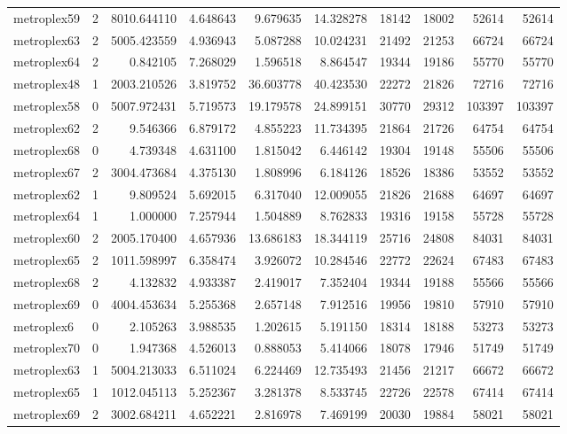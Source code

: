 \begin{longtable}{|l|r|r|r|r|r|r|r|r|r|}
metroplex59 & 2 & 8010.644110 & 4.648643 & 9.679635 & 14.328278 & 18142 & 18002 & 52614 & 52614 \\
metroplex63 & 2 & 5005.423559 & 4.936943 & 5.087288 & 10.024231 & 21492 & 21253 & 66724 & 66724 \\
metroplex64 & 2 & 0.842105 & 7.268029 & 1.596518 & 8.864547 & 19344 & 19186 & 55770 & 55770 \\
metroplex48 & 1 & 2003.210526 & 3.819752 & 36.603778 & 40.423530 & 22272 & 21826 & 72716 & 72716 \\
metroplex58 & 0 & 5007.972431 & 5.719573 & 19.179578 & 24.899151 & 30770 & 29312 & 103397 & 103397 \\
metroplex62 & 2 & 9.546366 & 6.879172 & 4.855223 & 11.734395 & 21864 & 21726 & 64754 & 64754 \\
metroplex68 & 0 & 4.739348 & 4.631100 & 1.815042 & 6.446142 & 19304 & 19148 & 55506 & 55506 \\
metroplex67 & 2 & 3004.473684 & 4.375130 & 1.808996 & 6.184126 & 18526 & 18386 & 53552 & 53552 \\
metroplex62 & 1 & 9.809524 & 5.692015 & 6.317040 & 12.009055 & 21826 & 21688 & 64697 & 64697 \\
metroplex64 & 1 & 1.000000 & 7.257944 & 1.504889 & 8.762833 & 19316 & 19158 & 55728 & 55728 \\
metroplex60 & 2 & 2005.170400 & 4.657936 & 13.686183 & 18.344119 & 25716 & 24808 & 84031 & 84031 \\
metroplex65 & 2 & 1011.598997 & 6.358474 & 3.926072 & 10.284546 & 22772 & 22624 & 67483 & 67483 \\
metroplex68 & 2 & 4.132832 & 4.933387 & 2.419017 & 7.352404 & 19344 & 19188 & 55566 & 55566 \\
metroplex69 & 0 & 4004.453634 & 5.255368 & 2.657148 & 7.912516 & 19956 & 19810 & 57910 & 57910 \\
metroplex6 & 0 & 2.105263 & 3.988535 & 1.202615 & 5.191150 & 18314 & 18188 & 53273 & 53273 \\
metroplex70 & 0 & 1.947368 & 4.526013 & 0.888053 & 5.414066 & 18078 & 17946 & 51749 & 51749 \\
metroplex63 & 1 & 5004.213033 & 6.511024 & 6.224469 & 12.735493 & 21456 & 21217 & 66672 & 66672 \\
metroplex65 & 1 & 1012.045113 & 5.252367 & 3.281378 & 8.533745 & 22726 & 22578 & 67414 & 67414 \\
metroplex69 & 2 & 3002.684211 & 4.652221 & 2.816978 & 7.469199 & 20030 & 19884 & 58021 & 58021 \\

\end{longtable}
